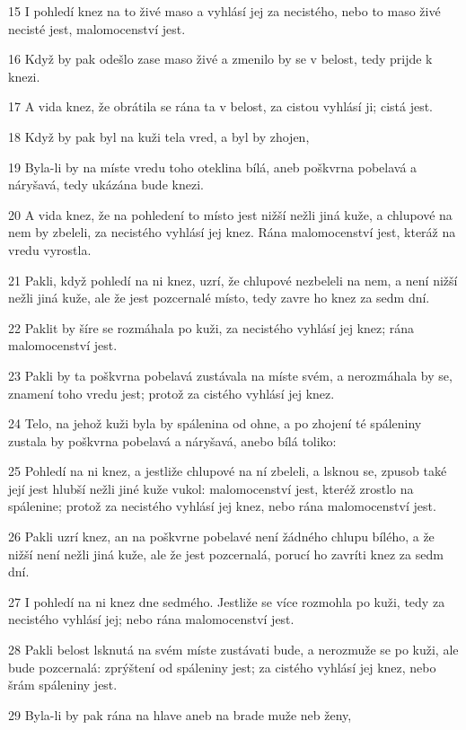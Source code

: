 \par 15 I pohledí knez na to živé maso a vyhlásí jej za necistého, nebo to maso živé necisté jest, malomocenství jest.
\par 16 Když by pak odešlo zase maso živé a zmenilo by se v belost, tedy prijde k knezi.
\par 17 A vida knez, že obrátila se rána ta v belost, za cistou vyhlásí ji; cistá jest.
\par 18 Když by pak byl na kuži tela vred, a byl by zhojen,
\par 19 Byla-li by na míste vredu toho oteklina bílá, aneb poškvrna pobelavá a náryšavá, tedy ukázána bude knezi.
\par 20 A vida knez, že na pohledení to místo jest nižší nežli jiná kuže, a chlupové na nem by zbeleli, za necistého vyhlásí jej knez. Rána malomocenství jest, kteráž na vredu vyrostla.
\par 21 Pakli, když pohledí na ni knez, uzrí, že chlupové nezbeleli na nem, a není nižší nežli jiná kuže, ale že jest pozcernalé místo, tedy zavre ho knez za sedm dní.
\par 22 Paklit by šíre se rozmáhala po kuži, za necistého vyhlásí jej knez; rána malomocenství jest.
\par 23 Pakli by ta poškvrna pobelavá zustávala na míste svém, a nerozmáhala by se, znamení toho vredu jest; protož za cistého vyhlásí jej knez.
\par 24 Telo, na jehož kuži byla by spálenina od ohne, a po zhojení té spáleniny zustala by poškvrna pobelavá a náryšavá, anebo bílá toliko:
\par 25 Pohledí na ni knez, a jestliže chlupové na ní zbeleli, a lsknou se, zpusob také její jest hlubší nežli jiné kuže vukol: malomocenství jest, kteréž zrostlo na spálenine; protož za necistého vyhlásí jej knez, nebo rána malomocenství jest.
\par 26 Pakli uzrí knez, an na poškvrne pobelavé není žádného chlupu bílého, a že nižší není nežli jiná kuže, ale že jest pozcernalá, porucí ho zavríti knez za sedm dní.
\par 27 I pohledí na ni knez dne sedmého. Jestliže se více rozmohla po kuži, tedy za necistého vyhlásí jej; nebo rána malomocenství jest.
\par 28 Pakli belost lsknutá na svém míste zustávati bude, a nerozmuže se po kuži, ale bude pozcernalá: zprýštení od spáleniny jest; za cistého vyhlásí jej knez, nebo šrám spáleniny jest.
\par 29 Byla-li by pak rána na hlave aneb na brade muže neb ženy,
